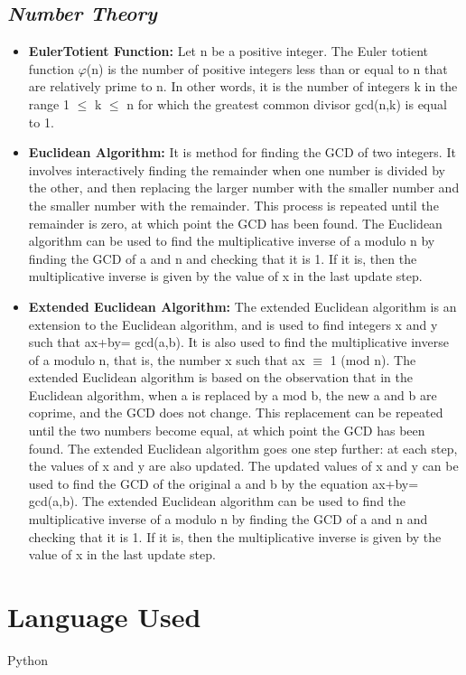 \documentclass{article}
\begin{document}
\subsection{\textbf{\textit{Number Theory}}}
\begin{itemize}
	\item \textbf{EulerTotient Function:} Let n be a positive integer. The Euler totient function $\varphi$(n) is the number of positive integers less than or equal to n that are relatively prime to n. In other words, it is the number of integers k in the range 1 $\leq$ k $\leq$ n for which the greatest common divisor gcd(n,k) is equal to 1.
	\item \textbf{Euclidean Algorithm:} It is method for finding the GCD of two integers. It involves interactively finding the remainder when one number is divided by the other, and then replacing the larger number with the smaller number and the smaller number with the remainder. This process is repeated until the remainder is zero, at which point the GCD has been found. The Euclidean algorithm can be used to find the multiplicative inverse of a modulo n by finding the GCD of a and n and checking that it is 1. If it is, then the multiplicative inverse is given by the value of x in the last update step.
	\item \textbf{Extended Euclidean Algorithm:} The extended Euclidean algorithm is an extension to the Euclidean algorithm, and is used to find integers x and y such that ax+by= gcd(a,b). It is also used to find the multiplicative inverse of a modulo n, that is, the number x such that ax $\equiv$ 1 (mod n). The extended Euclidean algorithm is based on the observation that in the Euclidean algorithm, when a is replaced by a mod b, the new a and b are coprime, and the GCD does not change. This replacement can be repeated until the two numbers become equal, at which point the GCD has been found. The extended Euclidean algorithm goes one step further: at each step, the values of x and y are also updated. The updated values of x and y can be used to find the GCD of the original a and b by the equation ax+by= gcd(a,b). The extended Euclidean algorithm can be used to find the multiplicative inverse of a modulo n by finding the GCD of a and n and checking that it is 1. If it is, then the multiplicative inverse is given by the value of x in the last update step.
\end{itemize}
\section{\textbf{Language Used}}
Python 
\end{document}
